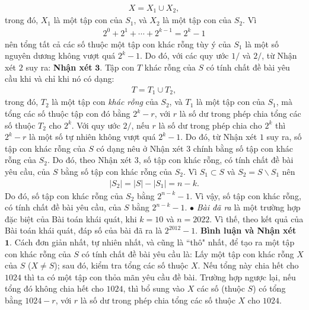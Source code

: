 \begin{multicols}{2}
	\begin{align*}
		X = {X_1} \cup {X_2},
	\end{align*}
	trong đó, $X_1$  là một tập con của  $S_1$, và $X_2$  là một tập con của $S_2$.
	\vskip 0.05cm 
	Vì
	\begin{align*}
		{2^0} + {2^1} +  \cdots  + {2^{k - 1}} = {2^k} - 1
	\end{align*}
	nên tổng tất cả các số thuộc một tập con khác rỗng tùy ý của $S_1$  là một số nguyên dương không vượt quá $2^k -1$.  Do đó, với các quy ước $1/$ và $2/$, từ Nhận xét $2$ suy ra:
	\vskip 0.05cm
	\textbf{\color{thachthuctoanhoc}Nhận xét} $\pmb{3.}$ Tập con $T$ khác rỗng của $S$ có tính chất đề bài yêu cầu khi và chỉ khi nó có dạng:
	\begin{align*}
		T = {T_1} \cup {T_2},
	\end{align*}
	trong đó, $T_2$ là một tập con \textit{khác rỗng} của $S_2$, và $T_1$ là một tập con của  $S_1$, mà tổng các số thuộc tập con đó bằng  $2^k -r$, với $r$ là số dư trong phép chia tổng các số thuộc $T_2$  cho  $2^k$.
	\vskip 0.05cm
	Với quy ước $2/$, nếu $r$ là số dư trong phép chia cho $2^k$  thì $2^k -r$ là một số tự nhiên không vượt quá  $2^k -1$. Do đó, từ Nhận xét $1$ suy ra, số tập con khác rỗng của $S$ có dạng nêu ở Nhận xét $3$ chính bằng số tập con khác rỗng của $S_2$. Do đó, theo Nhận xét $3$, số tập con khác rỗng, có tính chất đề bài yêu cầu, của $S$ bằng số tập con khác rỗng của  $S_2$.
	\vskip 0.05cm
	Vì ${S_1} \subset S$  và  ${S_2} = S \backslash S_1$ nên
	\begin{align*}
		\left| {{S_2}} \right| = \left| S \right| - \left| {{S_1}} \right| = n - k.
	\end{align*}
	Do đó, số tập con khác rỗng của  $S_2$ bằng  ${2^{n - k}} - 1$.
	\vskip 0.05cm 
	Vì vậy, số tập con khác rỗng, có tính chất đề bài yêu cầu, của $S$ bằng ${2^{n - k}} - 1$.
	\vskip 0.05cm 
	$\bullet$ \textit{Bài đã ra} là một trường hợp đặc biệt của Bài toán khái quát, khi $k = 10$ và $n = 2022$. Vì thế, theo kết quả của Bài toán khái quát, đáp số của bài đã ra là $2^{2012} -1$.
	\vskip 0.05cm 
	\textbf{\color{thachthuctoanhoc}Bình luận và Nhận xét}
	\vskip 0.05cm
	$\pmb{1.}$ Cách đơn giản nhất, tự nhiên nhất, và cũng là ``thô" nhất, để tạo ra một tập con khác rỗng của $S$ có tính chất đề bài yêu cầu là: Lấy một tập con khác rỗng $X$ của $S$ ($X \ne S$); sau đó, kiểm tra tổng các số thuộc $X$. Nếu tổng này chia hết cho $1024$ thì ta có một tập con thỏa mãn yêu cầu đề bài. Trường hợp ngược lại, nếu tổng đó không chia hết cho $1024$, thì bổ sung vào $X$ các số (thuộc $S$) có tổng bằng $1024 - r$, với $r$ là số dư trong phép chia tổng các số thuộc $X$ cho $1024$.

\end{multicols}
